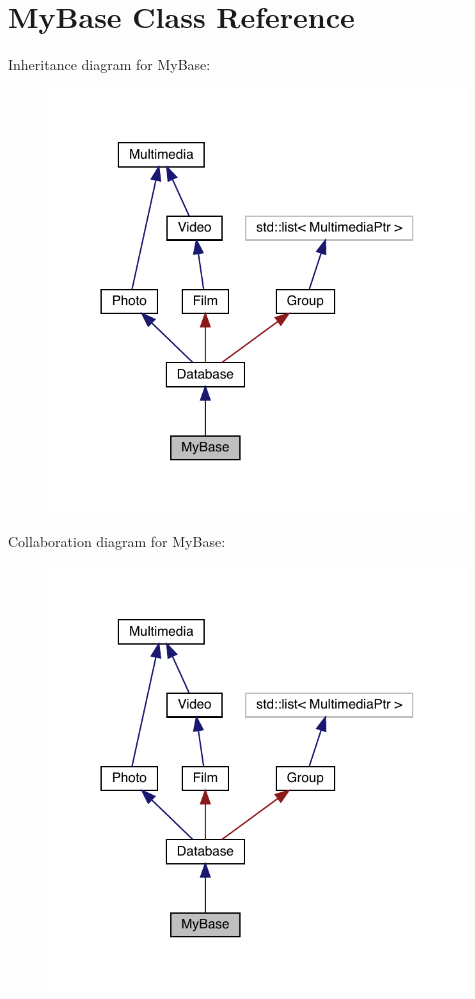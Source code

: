 \hypertarget{class_my_base}{}\section{My\+Base Class Reference}
\label{class_my_base}


Inheritance diagram for My\+Base\+:
\nopagebreak
\begin{figure}[H]
\begin{center}
\leavevmode
\includegraphics[width=314pt]{class_my_base__inherit__graph}
\end{center}
\end{figure}


Collaboration diagram for My\+Base\+:
\nopagebreak
\begin{figure}[H]
\begin{center}
\leavevmode
\includegraphics[width=314pt]{class_my_base__coll__graph}
\end{center}
\end{figure}
